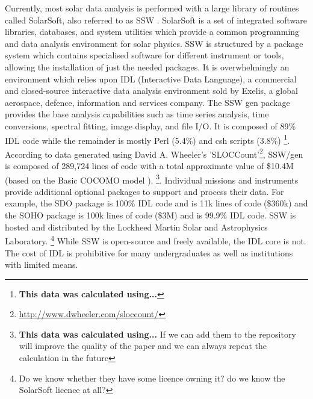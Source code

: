 Currently, most solar data analysis is performed with a large library 
of routines called SolarSoft, also referred to as SSW 
\cite{freeland1998}. SolarSoft is a set of integrated software 
libraries, databases, and system utilities which provide a common 
programming and data analysis environment for solar physics. 
SSW is structured by a package system which contains
specialised software for different instrument or tools, 
allowing the installation of just the needed packages.
It is 
overwhelmingly an environment which relies upon IDL (Interactive Data 
Language), a commercial and closed-source interactive data analysis 
environment sold by Exelis, a global aerospace, defence, information 
and services company. The SSW gen package provides the base analysis 
capabilities such as time series analysis, time conversions, spectral 
fitting, image display, and file I/O. It is composed of 89\% IDL code 
while the remainder is mostly Perl (5.4\%) and csh scripts (3.8\%)
\footnote{{\bf This data was calculated using...}}. 
According to data generated using David A. Wheeler's 'SLOCCount'\footnote{
\url{http://www.dwheeler.com/sloccount/}}, 
SSW/gen is composed of 289,724 lines of code with a total approximate 
value of \$10.4M (based on the Basic COCOMO model \cite{_cocomo_2014}).
\footnote{{\bf This data was calculated using...} If we can add them to the
repository will improve the quality of the paper and we can always repeat the calculation in the future}. 
Individual 
missions and instruments provide additional optional packages to 
support and process their data. For example, the SDO package 
\cite{sdo} is 100\% IDL code and is 11k lines of code (\$360k) 
and the SOHO package \cite{soho} is 100k lines of code (\$3M) and is 
99.9\% IDL code. SSW is hosted and distributed by the Lockheed Martin 
Solar and Astrophysics Laboratory.
\footnote{Do we know whether they have some licence owning it? do we know the SolarSoft licence at all?}
While SSW is open-source and freely available, the IDL core is not. The cost 
of IDL is prohibitive for many undergraduates as well as institutions 
with limited means. 

